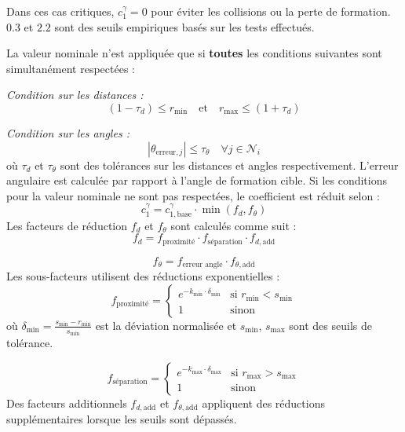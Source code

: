 Dans ces cas critiques, $c_1^\gamma = 0$ pour éviter les collisions ou la perte de formation. $0.3$ et $2.2$ sont des seuils empiriques basés sur les tests effectués.

La valeur nominale n'est appliquée que si \textbf{toutes} les conditions suivantes sont simultanément respectées :

\textit{Condition sur les distances :}
\begin{equation}
(1 - \tau_d) \leq r_{\min} \quad \text{et} \quad r_{\max} \leq (1 + \tau_d)
\end{equation}

\textit{Condition sur les angles :}
\begin{equation}
|\theta_{\text{erreur},j}| \leq \tau_\theta \quad \forall j \in \mathcal{N}_i
\end{equation}
où $\tau_d$ et $\tau_\theta$ sont des tolérances sur les distances et angles respectivement. L'erreur angulaire est calculée par rapport à l'angle de formation cible.
Si les conditions pour la valeur nominale ne sont pas respectées, le coefficient est réduit selon :
\begin{equation}
c_1^\gamma = c_{1,\text{base}}^\gamma \cdot \min(f_d, f_\theta)
\end{equation}
Les facteurs de réduction $f_d$ et $f_\theta$ sont calculés comme suit :
\begin{equation}
f_d = f_{\text{proximité}} \cdot f_{\text{séparation}} \cdot f_{d,\text{add}}
\end{equation}

\begin{equation}
f_\theta = f_{\text{erreur angle}} \cdot f_{\theta,\text{add}}
\end{equation}
Les sous-facteurs utilisent des réductions exponentielles :
\begin{equation}
f_{\text{proximité}} = \begin{cases}
e^{-k_{\min} \cdot \delta_{\min}} & \text{si } r_{\min} < s_{\min} \\
1 & \text{sinon}
\end{cases}
\end{equation}
où $\delta_{\min} = \frac{s_{\min} - r_{\min}}{s_{\min}}$ est la déviation normalisée et $s_{\min}$, $s_{\max}$ sont des seuils de tolérance.

\begin{equation}
    f_{\text{séparation}} = \begin{cases}
    e^{-k_{\max} \cdot \delta_{\max}} & \text{si } r_{\max} > s_{\max} \\
    1 & \text{sinon}
    \end{cases}
\end{equation}
Des facteurs additionnels $f_{d,\text{add}}$ et $f_{\theta,\text{add}}$ appliquent des réductions supplémentaires lorsque les seuils sont dépassés.

